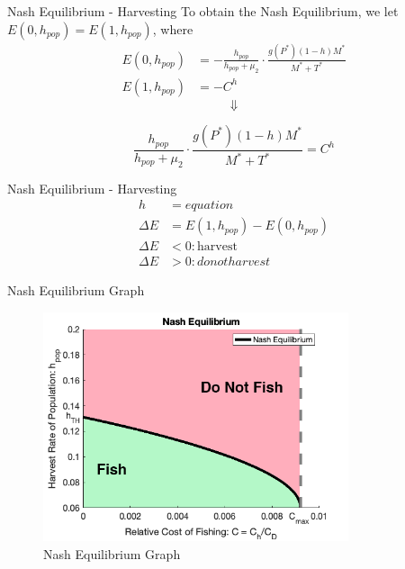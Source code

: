 \documentclass{beamer}
\begin{document}
\begin{frame}{Nash Equilibrium - Harvesting}
    To obtain the Nash Equilibrium, we let $E(0, h_{pop}) = E(1, h_{pop})$, where \\
    \begin{align*}
        E(0, h_{pop}) &= -\frac{h_{pop}}{h_{pop} + \mu_{2}} \cdot \frac{g(P^{*})(1-h)M^{*}}{M^{*} + T^{*}} \\
        E(1, h_{pop}) &= -C^{h}
    \end{align*}
    $$\Downarrow$$
    
    
    
    
    
    $$\frac{h_{pop}}{h_{pop} + \mu_{2}} \cdot \frac{g(P^{*})(1-h)M^{*}}{M^{*} + T^{*}} = C^{h}$$

\end{frame}

\begin{frame}{Nash Equilibrium - Harvesting}
    \begin{align*}
        h &= equation\\
        \Delta E &= E(1, h_{pop}) - E(0, h_{pop}) \\
        \Delta E &< 0: \text{harvest} \\
        \Delta E &> 0: do not harvest
    \end{align*}
\end{frame}

\begin{frame}{Nash Equilibrium Graph}
    \begin{figure}
        \centering
        \includegraphics[width = 0.8\textwidth]{Latex/Figures/Graphs/nash_1.png}
        \caption{Nash Equilibrium Graph}
        \label{fig:NE_Graph}
    \end{figure}
\end{frame}
\end{document}
